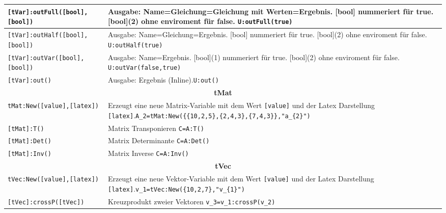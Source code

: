 \begin{table}[ht]
	\begin{tabular}{|p{}|p{}|}
		\hline
				\lstinline{[tVar]:outFull([bool],[bool])} & Ausgabe: Name=Gleichung=Gleichung mit Werten=Ergebnis. [bool] nummeriert für true. [bool](2) ohne enviroment für false.  \newline \lstinline!U:outFull(true) !\\
				\hline
		\hline
		\lstinline{[tVar]:outHalf([bool],[bool])} & Ausgabe: Name=Gleichung=Ergebnis. [bool] nummeriert für true. [bool](2) ohne enviroment für false. \newline \lstinline!U:outHalf(true) !\\
		\hline
		\lstinline{[tVar]:outVar([bool],[bool])} & Ausgabe: Name=Ergebnis. [bool](1) nummeriert für true. [bool](2) ohne enviroment für false.  \newline \lstinline!U:outVar(false,true) !\\
		\hline
		\lstinline{[tVar]:out()} & Ausgabe: Ergebnis (Inline).\newline \lstinline!U:out() !\\
		\hline

		\hline
		\multicolumn{2}{|c|}{\textbf{tMat}}\\
		\hline
		\lstinline{tMat:New([value],[latex])} & Erzeugt eine neue Matrix-Variable mit dem Wert \lstinline{[value]} und der Latex Darstellung \lstinline{[latex]}.\newline \lstinline!A_2=tMat:New({{10,2,5},{2,4,3},{7,4,3}},"a_{2}")!\\
		\hline
		\lstinline{[tMat]:T()} & Matrix Transponieren \newline \lstinline!C=A:T()!\\
		\hline
		\lstinline{[tMat]:Det()} & Matrix Determinante \newline \lstinline!C=A:Det()!\\
		\hline
		\lstinline{[tMat]:Inv()} & Matrix Inverse \newline \lstinline!C=A:Inv()!\\
		\hline
		\multicolumn{2}{|c|}{\textbf{tVec}}\\
		\hline
		\lstinline{tVec:New([value],[latex])} & Erzeugt eine neue Vektor-Variable mit dem Wert \lstinline{[value]} und der Latex Darstellung \lstinline{[latex]}.\newline \lstinline!v_1=tVec:New({10,2,7},"v_{1}")!\\
		\hline
		\lstinline{[tVec]:crossP([tVec])} & Kreuzprodukt zweier Vektoren \newline \lstinline!v_3=v_1:crossP(v_2)!\\
		\hline
	\end{tabular}
\end{table}

